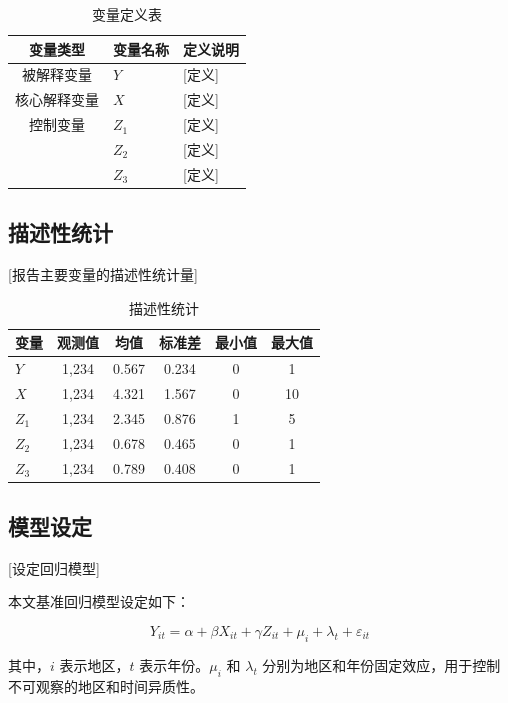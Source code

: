 \documentclass[UTF8, a4paper, 12pt]{ctexart}
\numberwithin{equation}{section}
\begin{document}
\begin{table}[H]
\caption{变量定义表}
\label{tab:var_def}
\centering
\begin{tabular}{cll}
\toprule
变量类型 & 变量名称 & 定义说明 \\
\midrule
被解释变量 & $Y$ & [定义] \\
\midrule
核心解释变量 & $X$ & [定义] \\
\midrule
控制变量 & $Z_1$ & [定义] \\
 & $Z_2$ & [定义] \\
 & $Z_3$ & [定义] \\
\bottomrule
\end{tabular}
\end{table}

\subsection{描述性统计}
[报告主要变量的描述性统计量]

\begin{table}[H]
\caption{描述性统计}
\label{tab:desc_stat}
\centering
\begin{tabular}{lccccc}
\toprule
变量 & 观测值 & 均值 & 标准差 & 最小值 & 最大值 \\
\midrule
$Y$ & 1,234 & 0.567 & 0.234 & 0 & 1 \\
$X$ & 1,234 & 4.321 & 1.567 & 0 & 10 \\
$Z_1$ & 1,234 & 2.345 & 0.876 & 1 & 5 \\
$Z_2$ & 1,234 & 0.678 & 0.465 & 0 & 1 \\
$Z_3$ & 1,234 & 0.789 & 0.408 & 0 & 1 \\
\bottomrule
\end{tabular}
\end{table}

\subsection{模型设定}
[设定回归模型]

本文基准回归模型设定如下：

\begin{equation}
\label{eq:baseline}
Y_{it} = \alpha + \beta X_{it} + \gamma Z_{it} + \mu_i + \lambda_t + \varepsilon_{it}
\end{equation}

其中，$i$ 表示地区，$t$ 表示年份。$\mu_i$ 和 $\lambda_t$ 分别为地区和年份固定效应，用于控制不可观察的地区和时间异质性。

\end{document}
